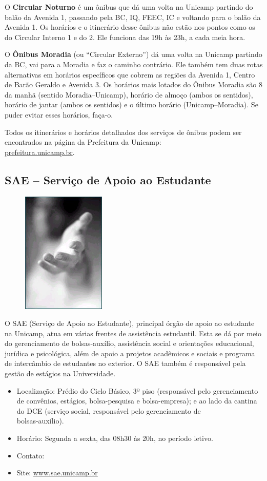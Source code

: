 O \textbf{Circular Noturno} é um ônibus que dá uma volta na Unicamp partindo do
balão da Avenida 1, passando pela BC, IQ, FEEC, IC e voltando para o balão da
Avenida 1.  Os horários e o itinerário desse ônibus não estão nos pontos como os
do Circular Interno 1 e do 2. Ele funciona das 19h às 23h, a cada meia hora.

O \textbf{Ônibus Moradia} (ou ``Circular Externo'') dá uma volta na Unicamp
partindo da BC, vai para a Moradia e faz o caminho contrário. Ele também tem
duas rotas alternativas em horários específicos que cobrem as regiões da Avenida
1, Centro de Barão Geraldo e Avenida 3. Os horários mais lotados do Ônibus
Moradia são 8 da manhã (sentido Moradia--Unicamp), horário de almoço (ambos os
sentidos), horário de jantar (ambos os sentidos) e o último horário
(Unicamp--Moradia). Se puder evitar esses horários, faça-o.

Todos os itinerários e horários detalhados dos serviços de ônibus podem ser
encontrados na página da Prefeitura da Unicamp: \\\url{prefeitura.unicamp.br}.

\subsection{SAE -- Serviço de Apoio ao Estudante}
\begin{figure}
    \centering
    \includegraphics[width=.2\textwidth]{img/alem_da_graduacao/sae.jpg}
\end{figure}
O SAE (Serviço de Apoio ao Estudante), principal órgão de apoio ao estudante na
Unicamp, atua em várias frentes de assistência estudantil. Esta se dá por meio do
gerenciamento de bolsas-auxílio, assistência social e orientações educacional,
jurídica e psicológica, além de apoio a projetos acadêmicos e sociais e programa
de intercâmbio de estudantes no exterior. O SAE também é responsável pela gestão
de estágios na Universidade.

\begin{itemize}
    \item  Localização: Prédio do Ciclo Básico, 3º piso (responsável pelo
        gerenciamento de convênios, estágios, bolsa-pesquisa e bolsa-empresa); e
        ao lado da cantina do DCE (serviço social, responsável pelo gerenciamento 
        de\\ bolsas-auxílio).
    \item  Horário: Segunda a sexta, das 08h30 às 20h, no período letivo.
    \item  Contato: 
    \item  Site: \url{www.sae.unicamp.br}
\end{itemize}

